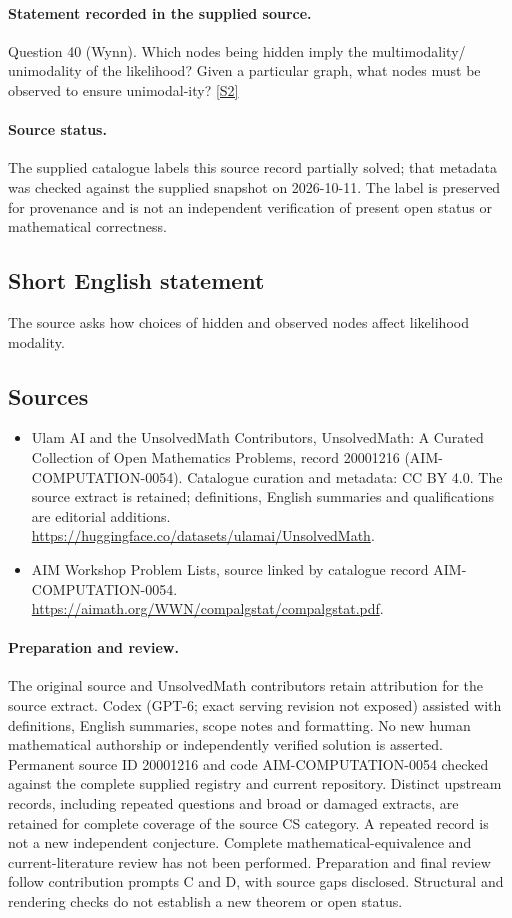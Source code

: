 \documentclass[11pt]{article}
\begin{document}
\paragraph{Statement recorded in the supplied source.}
Question 40 (Wynn). Which nodes being hidden imply the multimodality/ unimodality of the likelihood? Given a particular graph, what nodes must be observed to ensure unimodal-ity? \href{https://aimath.org/WWN/compalgstat/compalgstat.pdf}{[S2]}
\paragraph{Source status.}
The supplied catalogue labels this source record partially solved; that metadata was checked against the supplied snapshot on 2026-10-11. The label is preserved for provenance and is not an independent verification of present open status or mathematical correctness.
\subsection{Short English statement}
The source asks how choices of hidden and observed nodes affect likelihood modality.
\subsection{Sources}
\begin{itemize}
\item[S1] Ulam AI and the UnsolvedMath Contributors, UnsolvedMath: A Curated Collection of Open Mathematics Problems, record 20001216 (AIM-COMPUTATION-0054). Catalogue curation and metadata: CC BY 4.0. The source extract is retained; definitions, English summaries and qualifications are editorial additions.
\url{https://huggingface.co/datasets/ulamai/UnsolvedMath}.
\item[S2] AIM Workshop Problem Lists, source linked by catalogue record AIM-COMPUTATION-0054.
\url{https://aimath.org/WWN/compalgstat/compalgstat.pdf}.
\end{itemize}
\paragraph{Preparation and review.}
The original source and UnsolvedMath contributors retain attribution for the source extract. Codex (GPT-6; exact serving revision not exposed) assisted with definitions, English summaries, scope notes and formatting. No new human mathematical authorship or independently verified solution is asserted. Permanent source ID 20001216 and code AIM-COMPUTATION-0054 checked against the complete supplied registry and current repository. Distinct upstream records, including repeated questions and broad or damaged extracts, are retained for complete coverage of the source CS category. A repeated record is not a new independent conjecture. Complete mathematical-equivalence and current-literature review has not been performed. Preparation and final review follow contribution prompts C and D, with source gaps disclosed. Structural and rendering checks do not establish a new theorem or open status.
\label{end:20001216}
\end{document}

